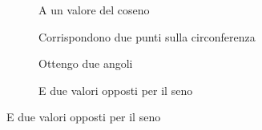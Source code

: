 \begin{figure}
	\begin{subfigure}[b]{.5\linewidth}
		\centering
	\caption{A un valore del coseno}\label{fig:senoNotoCoseno1}
	\end{subfigure}%
	\begin{subfigure}[b]{.5\linewidth}
		\centering
		\caption{Corrispondono due punti sulla circonferenza}\label{fig:senoNotoCoseno2}
	\end{subfigure}
	\begin{subfigure}[b]{.5\linewidth}
		\centering
		\caption{Ottengo due angoli}\label{fig:senoNotoCoseno3}
	\end{subfigure}%
	\begin{subfigure}[b]{.5\linewidth}
		\centering
		\caption{E due valori opposti per il seno}\label{fig:senoNotoCoseno4}
	\end{subfigure}
	\label{fig:senoNotoCosenoEs1a}
\end{figure}
